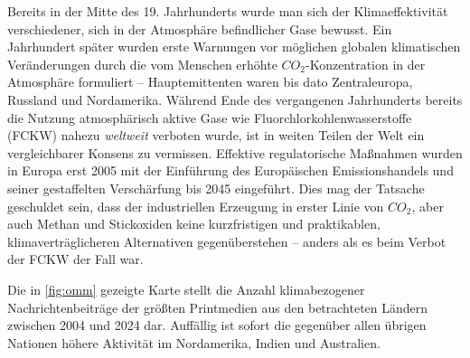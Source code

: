 Bereits in der Mitte des 19. Jahrhunderts wurde man sich der Klimaeffektivität verschiedener, sich in der Atmosphäre befindlicher Gase bewusst.
Ein Jahrhundert später wurden erste Warnungen vor möglichen globalen klimatischen Veränderungen durch die vom Menschen erhöhte \(CO_2\)-Konzentration in der Atmosphäre formuliert -- Hauptemittenten waren bis dato Zentraleuropa, Russland und Nordamerika.
Während Ende des vergangenen Jahrhunderts bereits die Nutzung atmosphärisch aktive Gase wie Fluorchlorkohlenwasserstoffe (FCKW) nahezu \textit{weltweit} verboten wurde, ist in weiten Teilen der Welt ein vergleichbarer Konsens zu vermissen.
Effektive regulatorische Maßnahmen wurden in Europa erst 2005 mit der Einführung des Europäischen Emissionshandels und seiner gestaffelten Verschärfung bis 2045 eingeführt.
Dies mag der Tatsache geschuldet sein, dass der industriellen Erzeugung in erster Linie von \(CO_2\), aber auch Methan und Stickoxiden keine kurzfristigen und praktikablen, klimaverträglicheren Alternativen gegenüberstehen -- anders als es beim Verbot der FCKW der Fall war.\par\medskip
%
Die in \cref{fig:omm} gezeigte Karte stellt die Anzahl klimabezogener Nachrichtenbeiträge der größten Printmedien aus den betrachteten Ländern zwischen 2004 und 2024 dar.
Auffällig ist sofort die gegenüber allen übrigen Nationen höhere Aktivität im Nordamerika, Indien und Australien.\par

{%
\vspace{\baselineskip}
\centering

\label{fig:omm}
\vspace{\baselineskip}
}


